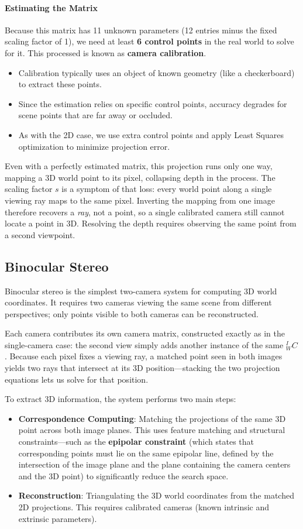 \paragraph{Estimating the Matrix}
Because this matrix has 11 unknown parameters (12 entries minus the fixed scaling factor of 1), we need at least \textbf{6 control points} in the real world to solve for it.
This processed is known as \textbf{camera calibration}. 
\begin{itemize}
    \item Calibration typically uses an object of known geometry (like a checkerboard) to extract these points.
    \item Since the estimation relies on specific control points, accuracy degrades for scene points that are far away or occluded. 
    \item As with the 2D case, we use extra control points and apply Least Squares optimization to minimize projection error.
\end{itemize}

Even with a perfectly estimated matrix, this projection runs only one way, mapping a 3D world point to its pixel, collapsing depth in the process.
The scaling factor $s$ is a symptom of that loss: every world point along a single viewing ray maps to the same pixel.
Inverting the mapping from one image therefore recovers a \emph{ray}, not a point, so a single calibrated camera still cannot locate a point in 3D.
Resolving the depth requires observing the same point from a second viewpoint.

\subsection{Binocular Stereo}
Binocular stereo is the simplest two-camera system for computing 3D world coordinates. 
It requires two cameras viewing the same scene from different perspectives; 
only points visible to both cameras can be reconstructed.

Each camera contributes its own camera matrix, constructed exactly as in the single-camera case: 
the second view simply adds another instance of the same $^I_WC$.
Because each pixel fixes a viewing ray, a matched point seen in both images yields two rays that intersect 
at its 3D position—stacking the two projection equations lets us solve for that position.

To extract 3D information, the system performs two main steps:
\begin{itemize}
    \item \textbf{Correspondence Computing}: Matching the projections of the same 3D point across both image planes. 
    This uses feature matching and structural constraints—such as the \textbf{epipolar constraint} 
    (which states that corresponding points must lie on the same epipolar line, defined by the intersection of the image plane and the plane containing the camera centers and the 3D point) to significantly reduce the search space.
    \item \textbf{Reconstruction}: Triangulating the 3D world coordinates from the matched 2D projections. 
    This requires calibrated cameras (known intrinsic and extrinsic parameters). 
\end{itemize}

